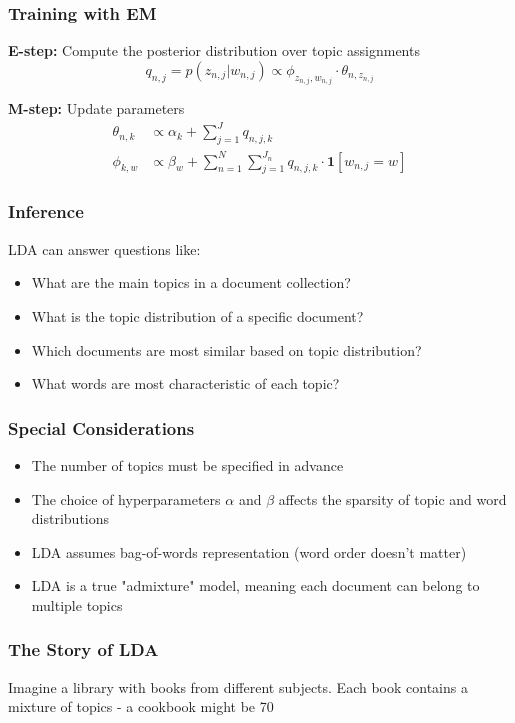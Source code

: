 \documentclass{article}
\begin{document}
\subsubsection{Training with EM}
\textbf{E-step:} Compute the posterior distribution over topic assignments
\begin{equation}
    q_{n,j} = p(z_{n,j}|w_{n,j}) \propto \phi_{z_{n,j},w_{n,j}} \cdot \theta_{n,z_{n,j}}
\end{equation}

\textbf{M-step:} Update parameters
\begin{align}
    \theta_{n,k} &\propto \alpha_k + \sum_{j=1}^J q_{n,j,k} \\
    \phi_{k,w} &\propto \beta_w + \sum_{n=1}^N\sum_{j=1}^{J_n} q_{n,j,k} \cdot \mathbf{1}[w_{n,j}=w]
\end{align}

\subsubsection{Inference}
LDA can answer questions like:
\begin{itemize}
    \item What are the main topics in a document collection?
    \item What is the topic distribution of a specific document?
    \item Which documents are most similar based on topic distribution?
    \item What words are most characteristic of each topic?
\end{itemize}

\subsubsection{Special Considerations}
\begin{itemize}
    \item The number of topics must be specified in advance
    \item The choice of hyperparameters $\alpha$ and $\beta$ affects the sparsity of topic and word distributions
    \item LDA assumes bag-of-words representation (word order doesn't matter)
    \item LDA is a true "admixture" model, meaning each document can belong to multiple topics
\end{itemize}

\subsubsection{The Story of LDA}
Imagine a library with books from different subjects. Each book contains a mixture of topics - a cookbook might be 70%
\end{document}

